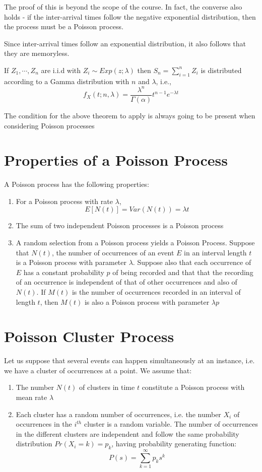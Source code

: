 \documentclass[12pt,letterpaper]{amsbook}
\theoremstyle{definition}
\begin{document}
The proof of this is beyond the scope of the course. In fact, the converse also holds - if the inter-arrival times follow the negative exponential distribution, then the process must be a Poisson process.

Since inter-arrival times follow an exponential distribution, it also follows that they are memoryless.

\begin{lemma}
  If $Z_1, \cdots, Z_n$ are i.i.d with $Z_i \sim Exp(z;\lambda)$ then $S_n = \sum_{i = 1}^{n}  Z_i$ is distributed according to a Gamma distribution with $n$ and $\lambda$, i.e.,
  \[f_X(t;n,\lambda) = \frac{\lambda^n}{\Gamma (\alpha)} t^{n-1} e^{-\lambda t}\]
\end{lemma}

The condition for the above theorem to apply is always going to be present when considering Poisson processes

\section{Properties of a Poisson Process}

A Poisson process has the following properties:

\begin{enumerate}
  \item For a Poisson process with rate $\lambda$, 
    \[E[N(t)] = Var(N(t)) = \lambda t\]
  \item The sum of two independent Poisson processes is a Poisson process
  \item A random selection from a Poisson process yields a Poisson Process. Suppose that $N(t)$, the number of occurrences of an event $E$ in an interval length $t$ is a Poisson process with parameter $\lambda$. Suppose also that each occurrence of $E$ has a constant probability $p$ of being recorded and that that the recording of an occurrence is independent of that of other occurrences and also of $N(t)$. If $M(t)$ is the number of occurrences recorded in an interval of length $t$, then $M(t)$ is also a Poisson process with parameter $\lambda p$
\end{enumerate}

\section{Poisson Cluster Process}

Let us suppose that several events can happen simultaneously at an instance, i.e. we have a cluster of occurrences at a point. We assume that:
\begin{enumerate}
  \item The number $N(t)$ of clusters in time $t$ constitute a Poisson process with mean rate $\lambda$
  \item Each cluster has a random number of occurrences, i.e. the number $X_i$ of occurrences in the $i^{th}$ cluster is a random variable. The number of occurrences in the different clusters are independent and follow the same probability distribution $Pr(X_i = k) = p_k$, having probability generating function:
    \[P(s) = \sum_{k = 1}^{\infty} p_ks^k\]
\end{enumerate}
\end{document}
